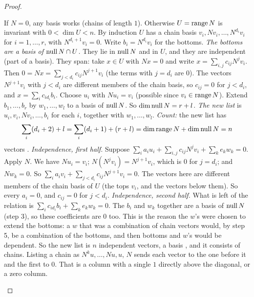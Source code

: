 \documentclass[10pt]{scrartcl}
\begin{document}
\begin{proof}
  \begin{steps}
    \ii If $N=0$, any basis works (chains of length $1$). Otherwise $U=\operatorname{range} N$ is invariant with $0<\dim U<n$. By induction $U$ has a chain basis $v_i,Nv_i,\dots,N^{d_i}v_i$ for $i=1,\dots,r$, with $N^{d_i+1}v_i=0$. Write $b_i=N^{d_i}v_i$ for the bottoms.
    \ii \emph{The bottoms are a basis of $\operatorname{null} N\cap U$.} They lie in $\operatorname{null} N$ and in $U$, and they are independent (part of a basis). They span: take $x\in U$ with $Nx=0$ and write $x=\sum_{i,j}c_{ij}N^jv_i$. Then $0=Nx=\sum_{j<d_i}c_{ij}N^{j+1}v_i$ (the terms with $j=d_i$ are $0$). The vectors $N^{j+1}v_i$ with $j<d_i$ are different members of the chain basis, so $c_{ij}=0$ for $j<d_i$, and $x=\sum_ic_{id_i}b_i$.
    \ii Choose $u_i$ with $Nu_i=v_i$ (possible since $v_i\in\operatorname{range} N$). Extend $b_1,\dots,b_r$ by $w_1,\dots,w_l$ to a basis of $\operatorname{null} N$. So $\dim\operatorname{null} N=r+l$.
    \ii \emph{The new list} is $u_i,v_i,Nv_i,\dots,b_i$ for each $i$, together with $w_1,\dots,w_l$. \emph{Count:} the new list has \[ \sum_i(d_i+2)+l=\sum_i(d_i+1)+(r+l)=\dim\operatorname{range} N+\dim\operatorname{null} N=n \] vectors .
    \ii \emph{Independence, first half.} Suppose $\sum_ia_iu_i+\sum_{i,j}c_{ij}N^jv_i+\sum_ke_kw_k=0$. Apply $N$. We have $Nu_i=v_i$; $N(N^jv_i)=N^{j+1}v_i$, which is $0$ for $j=d_i$; and $Nw_k=0$. So $\sum_ia_iv_i+\sum_{j<d_i}c_{ij}N^{j+1}v_i=0$. The vectors here are different members of the chain basis of $U$ (the tops $v_i$, and the vectors below them). So every $a_i=0$, and $c_{ij}=0$ for $j<d_i$.
    \ii \emph{Independence, second half.} What is left of the relation is $\sum_ic_{id_i}b_i+\sum_ke_kw_k=0$. The $b_i$ and $w_k$ together are a basis of $\operatorname{null} N$ (step 3), so these coefficients are $0$ too. This is the reason the $w$'s were chosen to extend the bottoms: a $w$ that was a combination of chain vectors would, by step 5, be a combination of the bottoms, and then bottoms and $w$'s would be dependent.
    \ii So the new list is $n$ independent vectors, a basis , and it consists of chains. Listing a chain as $N^ku,\dots,Nu,u$, $N$ sends each vector to the one before it and the first to $0$. That is a column with a single $1$ directly above the diagonal, or a zero column.
  \end{steps}
\end{proof}
\end{document}
